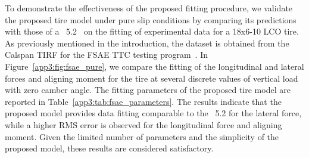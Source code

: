 
To demonstrate the effectiveness of the proposed fitting procedure, we validate the proposed tire model under pure slip conditions by comparing its predictions with those of a \MagicFormulae{}~5.2~\cite{pacejka2012tire} on the fitting of experimental data for a \Hoosier{} 18x6-10 LCO tire. As previously mentioned in the introduction, the dataset is obtained from the Calspan \ac{TIRF} for the \ac{FSAE} \ac{TTC} testing program~\cite{kasprzak2006formula}. In Figure~\ref{app3:fig:fsae_pure}, we compare the fitting of the longitudinal and lateral forces and aligning moment for the \Hoosier{} tire at several discrete values of vertical load with zero camber angle. The fitting parameters of the proposed tire model are reported in Table~\ref{app3:tab:fsae_parameters}. The results indicate that the proposed model provides data fitting comparable to the \MagicFormulae{}~5.2 for the lateral force, while a higher \ac{RMS} error is observed for the longitudinal force and aligning moment. Given the limited number of parameters and the simplicity of the proposed model, these results are considered satisfactory.

%  


